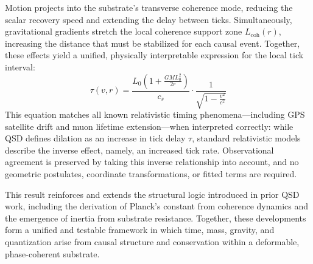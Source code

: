 \documentclass[entropy,article,submit,pdftex,moreauthors]{Definitions/mdpi}
\begin{document}
Motion projects into the substrate’s transverse coherence mode, reducing the scalar recovery speed and extending the delay between ticks. Simultaneously, gravitational gradients stretch the local coherence support zone \( L_{\text{coh}}(r) \), increasing the distance that must be stabilized for each causal event. Together, these effects yield a unified, physically interpretable expression for the local tick interval:
\[
\tau(v, r) =
\frac{L_0 \left(1 + \frac{GM L_0^2}{2r} \right)}{c_s}
\cdot \frac{1}{\sqrt{1 - \frac{v^2}{c^2}}}
\]
This equation matches all known relativistic timing phenomena—including GPS satellite drift and muon lifetime extension—when interpreted correctly: while QSD defines dilation as an increase in tick delay \( \tau \), standard relativistic models describe the inverse effect, namely, an increased tick rate. Observational agreement is preserved by taking this inverse relationship into account, and no geometric postulates, coordinate transformations, or fitted terms are required.

This result reinforces and extends the structural logic introduced in prior QSD work, including the derivation of Planck’s constant from coherence dynamics and the emergence of inertia from substrate resistance. Together, these developments form a unified and testable framework in which time, mass, gravity, and quantization arise from causal structure and conservation within a deformable, phase-coherent substrate.




\vspace{6pt} 



\end{document}

